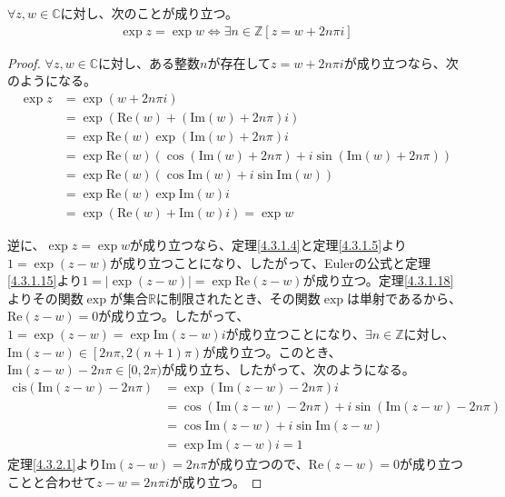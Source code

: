\documentclass[dvipdfmx]{jsarticle}
\begin{document}
\begin{thm}\label{4.3.2.2} $\forall z,w \in \mathbb{C}$に対し、次のことが成り立つ。
\begin{align*}
\exp z = \exp w \Leftrightarrow \exists n \in \mathbb{Z}[ z = w + 2n\pi i]
\end{align*}
\end{thm}
\begin{proof}
$\forall z,w \in \mathbb{C}$に対し、ある整数$n$が存在して$z = w + 2n\pi i$が成り立つなら、次のようになる。
\begin{align*}
\exp z &= \exp(w + 2n\pi i)\\
&= \exp\left( \mathrm{Re}(w) + \left( \mathrm{Im}(w) + 2n\pi \right)i \right)\\
&= \exp{\mathrm{Re}(w)}\exp{\left( \mathrm{Im}(w) + 2n\pi \right)i}\\
&= \exp{\mathrm{Re}(w)}\left( \cos{\left( \mathrm{Im}(w) + 2n\pi \right) + i\sin\left( \mathrm{Im}(w) + 2n\pi \right)} \right)\\
&= \exp{\mathrm{Re}(w)}\left( \cos{\mathrm{Im}(w) + i\sin{\mathrm{Im}(w)}} \right)\\
&= \exp{\mathrm{Re}(w)}\exp{\mathrm{Im}(w)i}\\
&= \exp\left( \mathrm{Re}(w) + \mathrm{Im}(w)i \right) = \exp w
\end{align*}\par
逆に、$\exp z = \exp w$が成り立つなら、定理\ref{4.3.1.4}と定理\ref{4.3.1.5}より$1 = \exp(z - w)$が成り立つことになり、したがって、Eulerの公式と定理\ref{4.3.1.15}より$1 = \left| \exp(z - w) \right| = \exp{\mathrm{Re}(z - w)}$が成り立つ。定理\ref{4.3.1.18}よりその関数$\exp$が集合$\mathbb{R}$に制限されたとき、その関数$\exp$は単射であるから、$\mathrm{Re}(z - w) = 0$が成り立つ。したがって、$1 = \exp(z - w) = \exp{\mathrm{Im}(z - w)i}$が成り立つことになり、$\exists n \in \mathbb{Z}$に対し、$\mathrm{Im}(z - w) \in \left[ 2n\pi,2(n + 1)\pi \right)$が成り立つ。このとき、$\mathrm{Im}(z - w) - 2n\pi \in [ 0,2\pi)$が成り立ち、したがって、次のようになる。
\begin{align*}
{\mathrm{cis}}\left( \mathrm{Im}(z - w) - 2n\pi \right) &= \exp{\left( \mathrm{Im}(z - w) - 2n\pi \right)i}\\
&= \cos\left( \mathrm{Im}(z - w) - 2n\pi \right) + i\sin\left( \mathrm{Im}(z - w) - 2n\pi \right)\\
&= \cos{\mathrm{Im}(z - w)} + i\sin{\mathrm{Im}(z - w)}\\
&= \exp{\mathrm{Im}(z - w)i} = 1
\end{align*}
定理\ref{4.3.2.1}より$\mathrm{Im}(z - w) = 2n\pi$が成り立つので、$\mathrm{Re}(z - w) = 0$が成り立つことと合わせて$z - w = 2n\pi i$が成り立つ。
\end{proof}
\end{document}
